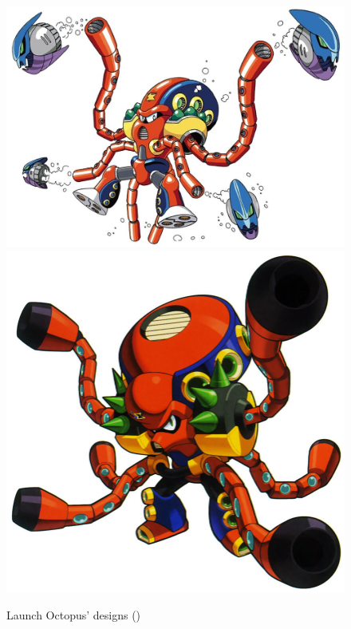 \begin{figure}[htp]
	\centering
	\includegraphics[height=\portraitsize]{figures/X1/Launch_octopus/LaunchOctopus.jpg}
	\includegraphics[height=\portraitsize]{figures/X1/Launch_octopus/MHXLaunchOctopus.jpg}
	\caption{Launch Octopus' designs (\cite{book:MMX_Complete_art})}
\end{figure}

